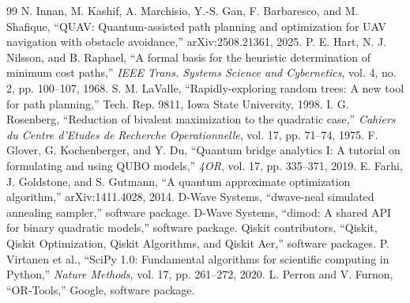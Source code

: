 \documentclass[10pt,conference]{IEEEtran}
\begin{document}
\begin{thebibliography}{99}
 N. Innan, M. Kashif, A. Marchisio, Y.-S. Gan, F. Barbaresco, and M. Shafique, ``QUAV: Quantum-assisted path planning and optimization for UAV navigation with obstacle avoidance,'' arXiv:2508.21361, 2025.
 P. E. Hart, N. J. Nilsson, and B. Raphael, ``A formal basis for the heuristic determination of minimum cost paths,'' \emph{IEEE Trans. Systems Science and Cybernetics}, vol. 4, no. 2, pp. 100--107, 1968.
 S. M. LaValle, ``Rapidly-exploring random trees: A new tool for path planning,'' Tech. Rep. 9811, Iowa State University, 1998.
 I. G. Rosenberg, ``Reduction of bivalent maximization to the quadratic case,'' \emph{Cahiers du Centre d'Etudes de Recherche Operationnelle}, vol. 17, pp. 71--74, 1975.
 F. Glover, G. Kochenberger, and Y. Du, ``Quantum bridge analytics I: A tutorial on formulating and using QUBO models,'' \emph{4OR}, vol. 17, pp. 335--371, 2019.
 E. Farhi, J. Goldstone, and S. Gutmann, ``A quantum approximate optimization algorithm,'' arXiv:1411.4028, 2014.
 D-Wave Systems, ``dwave-neal simulated annealing sampler,'' software package.
 D-Wave Systems, ``dimod: A shared API for binary quadratic models,'' software package.
 Qiskit contributors, ``Qiskit, Qiskit Optimization, Qiskit Algorithms, and Qiskit Aer,'' software packages.
 P. Virtanen et al., ``SciPy 1.0: Fundamental algorithms for scientific computing in Python,'' \emph{Nature Methods}, vol. 17, pp. 261--272, 2020.
 L. Perron and V. Furnon, ``OR-Tools,'' Google, software package.
\end{thebibliography}
\end{document}
